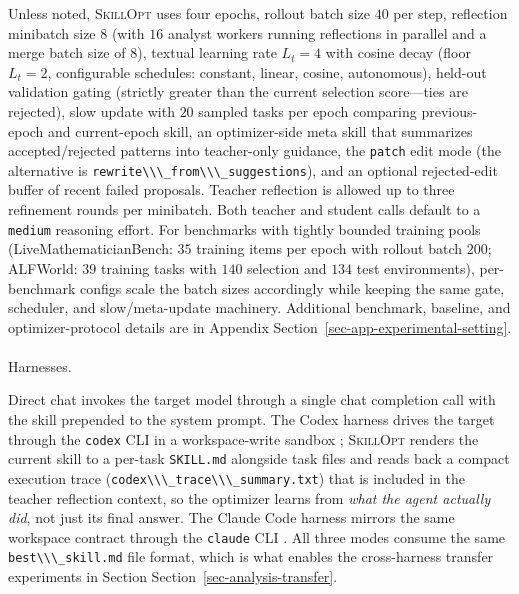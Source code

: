 \documentclass[
]{article}
\makeatletter
\let\oldparagraph\paragraph
\renewcommand{\paragraph}{
    \@ifstar
      \xxxParagraphStar
      \xxxParagraphNoStar
  }
\newcommand{\xxxParagraphStar}[1]{\oldparagraph*{#1}\mbox{}}
\newcommand{\xxxParagraphNoStar}[1]{\oldparagraph{#1}\mbox{}}
\newcommand{\passthrough}[1]{#1}
\newcommand{\ourmethod}{\textsc{SkillOpt}\xspace}
\makeatother
\begin{document}
Unless noted, \ourmethod{} uses four epochs, rollout batch size \(40\)
per step, reflection minibatch size \(8\) (with \(16\) analyst workers
running reflections in parallel and a merge batch size of \(8\)),
textual learning rate \(L_t=4\) with cosine decay (floor \(L_t=2\),
configurable schedules: constant, linear, cosine, autonomous), held-out
validation gating (strictly greater than the current selection
score---ties are rejected), slow update with \(20\) sampled tasks per
epoch comparing previous-epoch and current-epoch skill, an
optimizer-side meta skill that summarizes accepted/rejected patterns
into teacher-only guidance, the \passthrough{\lstinline!patch!} edit
mode (the alternative is
\passthrough{\lstinline!rewrite\\\_from\\\_suggestions!}), and an
optional rejected-edit buffer of recent failed proposals. Teacher
reflection is allowed up to three refinement rounds per minibatch. Both
teacher and student calls default to a \passthrough{\lstinline!medium!}
reasoning effort. For benchmarks with tightly bounded training pools
(LiveMathematicianBench: \(35\) training items per epoch with rollout
batch \(200\); ALFWorld: \(39\) training tasks with \(140\) selection
and \(134\) test environments), per-benchmark configs scale the batch
sizes accordingly while keeping the same gate, scheduler, and
slow/meta-update machinery. Additional benchmark, baseline, and
optimizer-protocol details are in Appendix
Section~\ref{sec-app-experimental-setting}.

\paragraph{Harnesses.}\label{harnesses.}

Direct chat invokes the target model through a single chat completion
call with the skill prepended to the system prompt. The Codex harness
drives the target through the \passthrough{\lstinline!codex!} CLI in a
workspace-write sandbox \citep{openai2025codex}; \ourmethod{} renders
the current skill to a per-task \passthrough{\lstinline!SKILL.md!}
alongside task files and reads back a compact execution trace
(\passthrough{\lstinline!codex\\\_trace\\\_summary.txt!}) that is
included in the teacher reflection context, so the optimizer learns from
\emph{what the agent actually did}, not just its final answer. The
Claude Code harness mirrors the same workspace contract through the
\passthrough{\lstinline!claude!} CLI \citep{anthropic2025claudecode}.
All three modes consume the same
\passthrough{\lstinline!best\\\_skill.md!} file format, which is what
enables the cross-harness transfer experiments in Section
Section~\ref{sec-analysis-transfer}.
\end{document}

